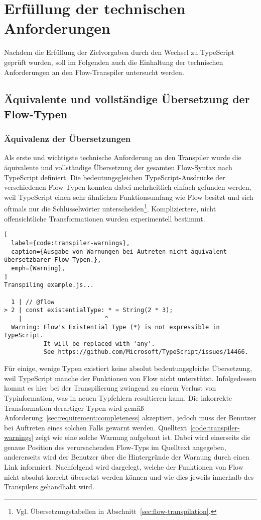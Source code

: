 \section{Erfüllung der technischen Anforderungen}

Nachdem die Erfüllung der Zielvorgaben durch den Wechsel zu TypeScript geprüft wurden, soll im Folgenden auch die Einhaltung der technischen Anforderungen an den Flow-Transpiler untersucht werden.

\subsection{Äquivalente und vollständige Übersetzung der Flow-Typen}
\label{sec:interpretation:equivalent-translation}

\subsubsection{Äquivalenz der Übersetzungen}

Als erste und wichtigste technische Anforderung an den Transpiler wurde die äquivalente und vollständige Übersetzung der gesamten Flow-Syntax nach TypeScript definiert. Die bedeutungsgleichen TypeScript-Ausdrücke der verschiedenen Flow-Typen konnten dabei mehrheitlich einfach gefunden werden, weil TypeScript einen sehr ähnlichen Funktionsumfang wie Flow besitzt und sich oftmals nur die Schlüsselwörter unterscheiden\footnote{Vgl. Übersetzungstabellen in Abschnitt~\ref{sec:flow-transpilation}.}. Kompliziertere, nicht offensichtliche Transformationen wurden experimentell bestimmt.

\begin{lstlisting}[
  label={code:transpiler-warnings},
  caption={Ausgabe von Warnungen bei Autreten nicht äquivalent übersetzbarer Flow-Typen.},
  emph={Warning},
]
Transpiling example.js...

  1 | // @flow
> 2 | const existentialType: * = String(2 * 3);
    |                       ^
  Warning: Flow's Existential Type (*) is not expressible in TypeScript.
           It will be replaced with 'any'.
           See https://github.com/Microsoft/TypeScript/issues/14466.
\end{lstlisting}

Für einige, wenige Typen existiert keine absolut bedeutungsgleiche Übersetzung, weil TypeScript manche der Funktionen von Flow nicht unterstützt. Infolgedessen kommt es hier bei der Transpilierung zwingend zu einem Verlust von Typinformation, was in neuen Typfehlern resultieren kann. Die inkorrekte Transformation derartiger Typen wird gemäß Anforderung~\ref{sec:requirement:completeness} akzeptiert, jedoch muss der Benutzer bei Auftreten eines solchen Falls gewarnt werden. Quelltext~\ref{code:transpiler-warnings} zeigt wie eine solche Warnung aufgebaut ist. Dabei wird einerseits die genaue Position des verursachenden Flow-Typs im Quelltext angegeben, andererseits wird der Benutzer über die Hintergründe der Warnung durch einen Link informiert. Nachfolgend wird dargelegt, welche der Funktionen von Flow nicht absolut korrekt übersetzt werden können und wie dies jeweils innerhalb des Transpilers gehandhabt wird.


